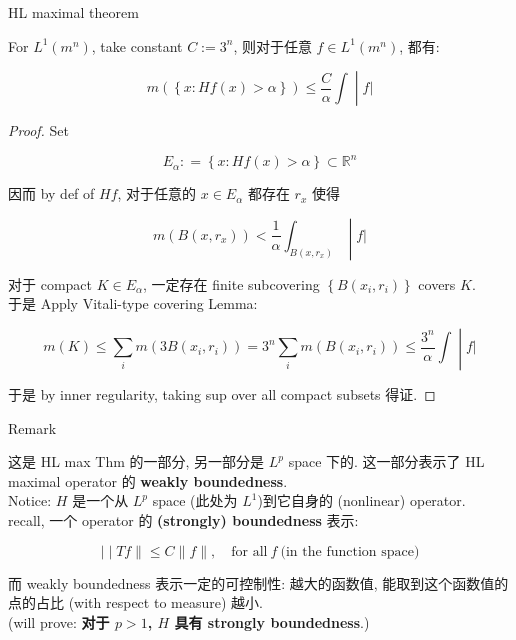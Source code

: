 \documentclass{qlnotes-export}
\begin{document}
\begin{theorem}{HL maximal theorem}\label{thm-08-hardy-littlewood-ldt-hl-maximal-theorem}

For \(L^{1}(m^{n})\), take constant \(C := 3^{n}\), 则对于任意 \(f \in L^{1}(m^{n})\), 都有:

\[\left. m(\left\{ {x:Hf(x) > \alpha} \right\}) \leq \frac{C}{\alpha}\int \middle| f| \right.\]

\end{theorem}

\begin{proof}

Set

\[E_{\alpha}: = \left\{ {x:Hf(x) > \alpha} \right\} \subset {\mathbb{R}}^{n}\]

因而 by def of \(Hf\), 对于任意的 \(x \in E_{\alpha}\) 都存在 \(r_{x}\) 使得

\[\left. m(B(x,r_{x})) < \frac{1}{\alpha}\int_{B(x,r_{x})} \middle| f| \right.\]

对于 compact \(K \in E_{\alpha}\), 一定存在 finite subcovering \(\left\{ {B(x_{i},r_{i})} \right\}\) covers \(K\).\\
于是 Apply Vitali-type covering Lemma:

\[\left. m(K) \leq \sum\limits_{i}m(3B(x_{i},r_{i})) = 3^{n}\sum\limits_{i}m(B(x_{i},r_{i})) \leq \frac{3^{n}}{\alpha}\int \middle| f| \right.\]

于是 by inner regularity, taking sup over all compact subsets 得证.

\end{proof}

\begin{qlremark}{Remark}

这是 HL max Thm 的一部分, 另一部分是 \(L^{p}\) space 下的. 这一部分表示了 HL maximal operator 的 \textbf{weakly boundedness}.\\
Notice: \(H\) 是一个从 \(L^{p}\) space (此处为 \(L^{1}\))到它自身的 (nonlinear) operator.\\
recall, 一个 operator 的 \textbf{(strongly) boundedness} 表示:

\[\left. | \middle| Tf \parallel \leq C \parallel f \parallel ,\quad\text{for all}\ f\ \text{(in the function space)} \right.\]

而 weakly boundedness 表示一定的可控制性: 越大的函数值, 能取到这个函数值的点的占比 (with respect to measure) 越小.\\
(will prove: \textbf{对于 \(p > 1\), \(H\) 具有 strongly boundedness}.)

\end{qlremark}
\end{document}
